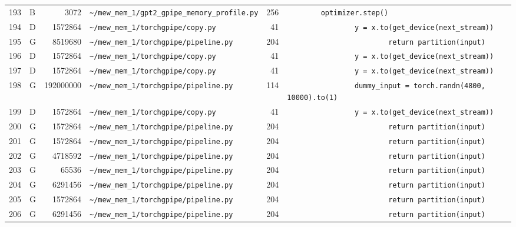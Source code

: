 \documentclass{article}
\begin{document}
\begin{longtable}{r l r p{6.5cm} r p{7.0cm}}
193 & B & 3072 & \lstinline|~/mew_mem_1/gpt2_gpipe_memory_profile.py| & 256 & \lstinline|        optimizer.step()| \\
194 & D & 1572864 & \lstinline|~/mew_mem_1/torchgpipe/copy.py| & 41 & \lstinline|                y = x.to(get_device(next_stream))| \\
195 & G & 8519680 & \lstinline|~/mew_mem_1/torchgpipe/pipeline.py| & 204 & \lstinline|                        return partition(input)| \\
196 & D & 1572864 & \lstinline|~/mew_mem_1/torchgpipe/copy.py| & 41 & \lstinline|                y = x.to(get_device(next_stream))| \\
197 & D & 1572864 & \lstinline|~/mew_mem_1/torchgpipe/copy.py| & 41 & \lstinline|                y = x.to(get_device(next_stream))| \\
198 & G & 192000000 & \lstinline|~/mew_mem_1/torchgpipe/pipeline.py| & 114 & \lstinline|                dummy_input = torch.randn(4800, 10000).to(1)| \\
199 & D & 1572864 & \lstinline|~/mew_mem_1/torchgpipe/copy.py| & 41 & \lstinline|                y = x.to(get_device(next_stream))| \\
200 & G & 1572864 & \lstinline|~/mew_mem_1/torchgpipe/pipeline.py| & 204 & \lstinline|                        return partition(input)| \\
201 & G & 1572864 & \lstinline|~/mew_mem_1/torchgpipe/pipeline.py| & 204 & \lstinline|                        return partition(input)| \\
202 & G & 4718592 & \lstinline|~/mew_mem_1/torchgpipe/pipeline.py| & 204 & \lstinline|                        return partition(input)| \\
203 & G & 65536 & \lstinline|~/mew_mem_1/torchgpipe/pipeline.py| & 204 & \lstinline|                        return partition(input)| \\
204 & G & 6291456 & \lstinline|~/mew_mem_1/torchgpipe/pipeline.py| & 204 & \lstinline|                        return partition(input)| \\
205 & G & 1572864 & \lstinline|~/mew_mem_1/torchgpipe/pipeline.py| & 204 & \lstinline|                        return partition(input)| \\
206 & G & 6291456 & \lstinline|~/mew_mem_1/torchgpipe/pipeline.py| & 204 & \lstinline|                        return partition(input)| \\
\end{longtable}
\end{document}
